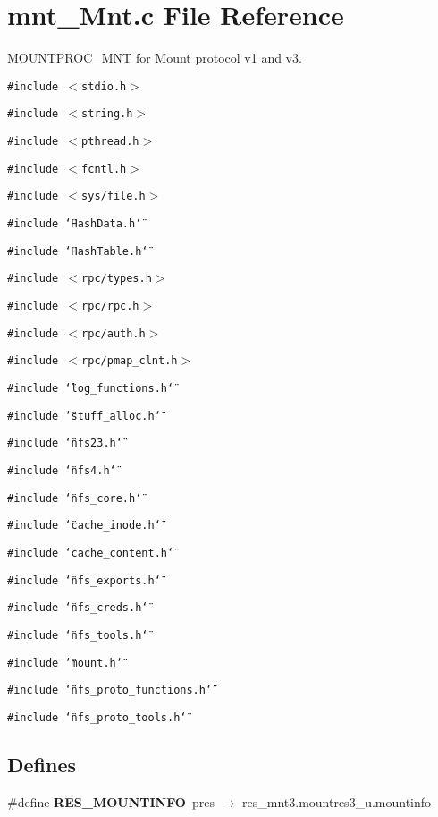 \section{mnt\_\-Mnt.c File Reference}
\label{mnt__Mnt_8c}
MOUNTPROC\_\-MNT for Mount protocol v1 and v3. 

{\tt \#include $<$stdio.h$>$}\par
{\tt \#include $<$string.h$>$}\par
{\tt \#include $<$pthread.h$>$}\par
{\tt \#include $<$fcntl.h$>$}\par
{\tt \#include $<$sys/file.h$>$}\par
{\tt \#include \char`\"{}Hash\-Data.h\char`\"{}}\par
{\tt \#include \char`\"{}Hash\-Table.h\char`\"{}}\par
{\tt \#include $<$rpc/types.h$>$}\par
{\tt \#include $<$rpc/rpc.h$>$}\par
{\tt \#include $<$rpc/auth.h$>$}\par
{\tt \#include $<$rpc/pmap\_\-clnt.h$>$}\par
{\tt \#include \char`\"{}log\_\-functions.h\char`\"{}}\par
{\tt \#include \char`\"{}stuff\_\-alloc.h\char`\"{}}\par
{\tt \#include \char`\"{}nfs23.h\char`\"{}}\par
{\tt \#include \char`\"{}nfs4.h\char`\"{}}\par
{\tt \#include \char`\"{}nfs\_\-core.h\char`\"{}}\par
{\tt \#include \char`\"{}cache\_\-inode.h\char`\"{}}\par
{\tt \#include \char`\"{}cache\_\-content.h\char`\"{}}\par
{\tt \#include \char`\"{}nfs\_\-exports.h\char`\"{}}\par
{\tt \#include \char`\"{}nfs\_\-creds.h\char`\"{}}\par
{\tt \#include \char`\"{}nfs\_\-tools.h\char`\"{}}\par
{\tt \#include \char`\"{}mount.h\char`\"{}}\par
{\tt \#include \char`\"{}nfs\_\-proto\_\-functions.h\char`\"{}}\par
{\tt \#include \char`\"{}nfs\_\-proto\_\-tools.h\char`\"{}}\par
\subsection*{Defines}
\begin{CompactItemize}
\item 
\#define {\bf RES\_\-MOUNTINFO}\ pres $\rightarrow$ res\_\-mnt3.mountres3\_\-u.mountinfo
\end{CompactItemize}
